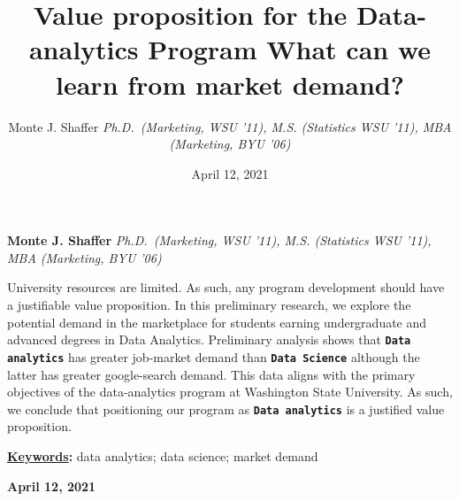 \documentclass[]{article}
\title{\textbf{\textcolor{WSU.crimson}{Value proposition for the
Data-analytics Program}} \newline \textbf{\textcolor{WSU.gray}{What can
we learn from market demand?}}  }
\author{\Large Monte J.
Shaffer\vspace{0.05in} \newline\normalsize\emph{Ph.D.~(Marketing, WSU
'11), M.S. (Statistics WSU '11), MBA (Marketing, BYU '06)}  }
\date{April 12, 2021}
\newcommand*{\authorfont}{\fontfamily{phv}\selectfont}
\renewenvironment{abstract}
 {{%
    \setlength{\leftmargin}{0mm}
    \setlength{\rightmargin}{\leftmargin}%
  }%
  \relax}
 {\endlist}
\begin{document}
	
%    


{%
\setlength{\parindent}{0pt}
\thispagestyle{plain}
{\fontsize{18}{20}\selectfont\raggedright 
\maketitle  %

}

{
   \vskip 13.5pt\relax \normalsize\fontsize{11}{12} 
   
\textbf{\authorfont Monte J.
Shaffer} \hskip 15pt \emph{\small Ph.D.~(Marketing, WSU '11), M.S.
(Statistics WSU '11), MBA (Marketing, BYU '06)}   

}

}








\begin{abstract}

    \hbox{\vrule height .2pt width 39.14pc}

    \vskip 8.5pt %

\noindent University resources are limited. As such, any program
development should have a justifiable value proposition. In this
preliminary research, we explore the potential demand in the marketplace
for students earning undergraduate and advanced degrees in Data
Analytics. Preliminary analysis shows that \textbf{\tt{Data analytics}}
has greater job-market demand than \textbf{\tt{Data Science}} although
the latter has greater google-search demand. This data aligns with the
primary objectives of the data-analytics program at Washington State
University. \newline As such, we conclude that positioning our program
as \textbf{\tt{Data analytics}} is a justified value proposition.


\vskip 8.5pt \noindent \textbf{\underline{Keywords}:} data analytics;
data science; market demand \par

    




    
    \hbox{\vrule height .2pt width 39.14pc}
    \vskip 5pt 
    \hfill \textbf{\textcolor{WSU.gray}{ April 12, 2021 } }
    \vskip 5pt 
    
\end{abstract}
\end{document}
